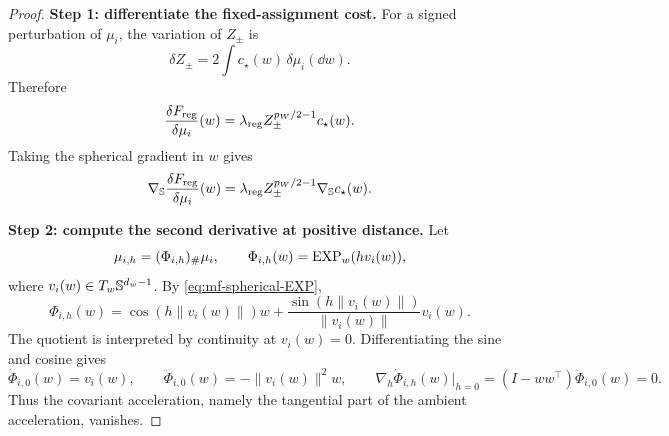 \begin{proof}
\noindent\textbf{Step 1: differentiate the fixed-assignment cost.}
For a signed perturbation of \(\mu_i\), the variation of \(Z_\pm\) is
\[
    \delta Z_\pm
    =
    2\int c_\star(w)\,\delta\mu_i(\dd w).
\]
Therefore
\[
    \frac{\delta F_{\mathrm{reg}}}{\delta\mu_i}(w)
    =
    \lambda_{\mathrm{reg}} Z_\pm^{p_W/2-1}c_\star(w).
\]
Taking the spherical gradient in \(w\) gives
\[
    \nabla_{\mathbb{S}}\frac{\delta F_{\mathrm{reg}}}{\delta\mu_i}(w)
    =
    \lambda_{\mathrm{reg}} Z_\pm^{p_W/2-1}\nabla_{\mathbb{S}} c_\star(w).
\]

\par\noindent\textbf{Step 2: compute the second derivative at positive distance.}
Let
\[
    \mu_{i,h}=(\Phi_{i,h})_\#\mu_i,
    \qquad
    \Phi_{i,h}(w)=\mathrm{EXP}_w(hv_i(w)),
\]
where $v_i(w)\in T_w\mathbb{S}^{d_w-1}$. By \eqref{eq:mf-spherical-EXP},
\[
 \Phi_{i,h}(w)=\cos(h\|v_i(w)\|)w+
       \frac{\sin(h\|v_i(w)\|)}{\|v_i(w)\|}v_i(w).
\]
The quotient is interpreted by continuity at $v_i(w)=0$.
Differentiating the sine and cosine gives
\begin{equation}
\label{eq:mf-EXP-second-jet}
 \dot\Phi_{i,0}(w)=v_i(w),\qquad
 \ddot\Phi_{i,0}(w)=-\|v_i(w)\|^2w,\qquad
 \nabla_h\dot\Phi_{i,h}(w)|_{h=0}
 =(I-ww^\top)\ddot\Phi_{i,0}(w)=0.
\end{equation}
Thus the covariant acceleration, namely the tangential part of the
ambient acceleration, vanishes.


\end{proof}
